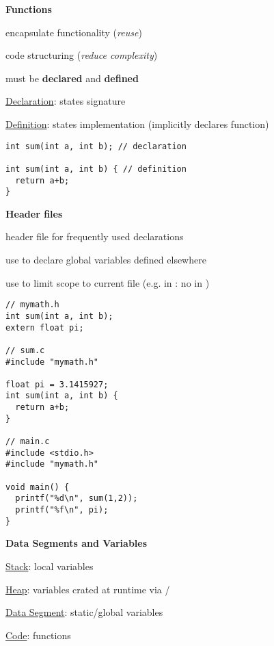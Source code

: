 \newpage

\textbf{Functions}
\begin{items}
  \item encapsulate functionality (\emph{reuse})
  \item code structuring (\emph{reduce complexity})
  \item must be \textbf{declared} and \textbf{defined}
  \item \underline{Declaration}: states signature
  \item \underline{Definition}: states implementation (implicitly declares function)
\end{items}
\begin{lstlisting}[style=customc]
int sum(int a, int b); // declaration

int sum(int a, int b) { // definition
  return a+b;
}
\end{lstlisting}

\textbf{Header files}
\begin{items}
  \item header file for frequently used declarations
  \item use  to declare global variables defined elsewhere
  \item use  to limit scope to current file (e.g.  in : no  in )
  \begin{lstlisting}[style=customc]
// mymath.h
int sum(int a, int b);
extern float pi;

// sum.c
#include "mymath.h"

float pi = 3.1415927;
int sum(int a, int b) {
  return a+b;
}

// main.c
#include <stdio.h>
#include "mymath.h"

void main() {
  printf("%d\n", sum(1,2));
  printf("%f\n", pi);
}
  \end{lstlisting}
\end{items}

\textbf{Data Segments and Variables}
\begin{items}
  \item \underline{Stack}: local variables
  \item \underline{Heap}: variables crated at runtime via /
  \item \underline{Data Segment}: static/global variables
  \item \underline{Code}: functions
\end{items}

